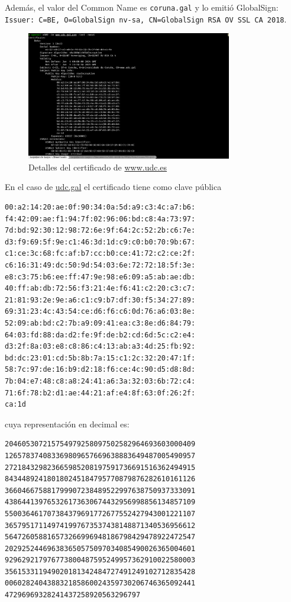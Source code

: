 Además, el valor del Common Name es \texttt{coruna.gal} y lo emitió GlobalSign: \\\texttt{Issuer: C=BE, O=GlobalSign nv-sa, CN=GlobalSign RSA OV SSL CA 2018}.

\begin{figure}[H]
    \centering
    \includegraphics[width=0.8\textwidth]{openssl-udc.png}
    \caption{Detalles del certificado de \url{www.udc.es}}
\end{figure}

En el caso de \url{udc.gal} el certificado tiene como clave pública

\begin{verbatim}
00:a2:14:20:ae:0f:90:34:0a:5d:a9:c3:4c:a7:b6:
f4:42:09:ae:f1:94:7f:02:96:06:bd:c8:4a:73:97:
7d:bd:92:30:12:98:72:6e:9f:64:2c:52:2b:c6:7e:
d3:f9:69:5f:9e:c1:46:3d:1d:c9:c0:b0:70:9b:67:
c1:ce:3c:68:fc:af:b7:cc:b0:ce:41:72:c2:ce:2f:
c6:16:31:49:dc:50:9d:54:03:6e:72:72:18:5f:3e:
e8:c3:75:b6:ee:ff:47:9e:98:e6:09:a5:ab:ae:db:
40:ff:ab:db:72:56:f3:21:4e:f6:41:c2:20:c3:c7:
21:81:93:2e:9e:a6:c1:c9:b7:df:30:f5:34:27:89:
69:31:23:4c:43:54:ce:d6:f6:c6:0d:76:a6:03:8e:
52:09:ab:bd:c2:7b:a9:09:41:ea:c3:8e:d6:84:79:
64:03:fd:88:da:d2:fe:9f:de:b2:cd:6d:5c:c2:e4:
d3:2f:8a:03:e8:c8:86:c4:13:ab:a3:4d:25:fb:92:
bd:dc:23:01:cd:5b:8b:7a:15:c1:2c:32:20:47:1f:
58:7c:97:de:16:b9:d2:18:f6:ce:4c:90:d5:d8:8d:
7b:04:e7:48:c8:a8:24:41:a6:3a:32:03:6b:72:c4:
71:6f:78:b2:d1:ae:44:21:af:e4:8f:63:0f:26:2f:
ca:1d
\end{verbatim}

cuya representación en decimal es:

\begin{verbatim}
204605307215754979258097502582964693603000409
126578374083369809657669638883649487005490957
272184329823665985208197591736691516362494915
843448924180180245184795770879876282610161126
366046675881799907238489522997638750937333091
438644139765326173630674432956998856134857109
550036461707384379691772677552427943001221107
365795171149741997673537438148871340536956612
564726058816573266996948186798429478922472547
202925244696383650575097034085490026365004601
929629217976773800487595249957362910022580003
356153311949020181342484727491249102712835428
006028240438832185860024359730206746365092441
47296969328241437258920563296797
\end{verbatim}

